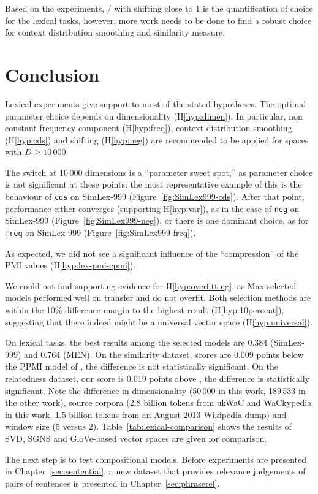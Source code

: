 Based on the experiments, \logNSCPMI/ with shifting close to 1 is the quantification of choice for the lexical tasks, however, more work needs to be done to find a robust choice for context distribution smoothing and similarity measure.

\section{Conclusion}
\label{sec:conclusion-lexical}

Lexical experiments give support to most of the stated hypotheses. The optimal parameter choice depends on dimensionality (H\ref{hyp:dimen}). In particular, non constant frequency component (H\ref{hyp:freq}), context distribution smoothing (H\ref{hyp:cds}) and shifting (H\ref{hyp:neg}) are recommended to be applied for spaces with $D \geq 10\,000$.

The switch at 10\,000 dimensions is a ``parameter sweet spot,'' as parameter choice is not significant at these points; the most representative example of this is the behaviour of \texttt{cds} on SimLex-999 (Figure~\ref{fig:SimLex999-cds}). After that point, performance either converges (supporting H\ref{hyp:var}), as in the case of \texttt{neg} on SimLex-999 (Figure~\ref{fig:SimLex999-neg}), or there is one dominant choice, as for \texttt{freq} on SimLex-999 (Figure~\ref{fig:SimLex999-freq}).

As expected, we did not see a significant influence of the ``compression'' of the PMI values (H\ref{hyp:lex-pmi-cpmi}).

We could not find supporting evidence for H\ref{hyp:overfitting}, as Max-selected models performed well on transfer and do not overfit. Both selection methods are within the 10\% difference margin to the highest result (H\ref{hyp:10percent}), suggesting that there indeed might be a universal vector space (H\ref{hyp:universal}).

 On lexical tasks, the best results among the selected models are 0.384 (SimLex-999) and 0.764 (MEN). On the similarity dataset, scores are 0.009 points below the PPMI model of , the difference is not statistically significant. On the relatedness dataset, our score is 0.019 points above \citet{TACL570}, the difference is statistically significant. Note the difference in dimensionality (50\,000 in this work, 189\,533 in the other work), source corpora (2.8 billion tokens from  ukWaC and WaCkypedia in this work, 1.5 billion tokens from an August 2013 Wikipedia dump) and window size (5 versus 2). Table~\ref{tab:lexical-comparison} shows the results of SVD, SGNS and GloVe-based vector spaces are given for comparison.

The next step is to test compositional models. Before experiments are presented in Chapter~\ref{sec:sentential}, a new dataset that provides relevance judgements of pairs of sentences is presented in Chapter~\ref{sec:phraserel}.

